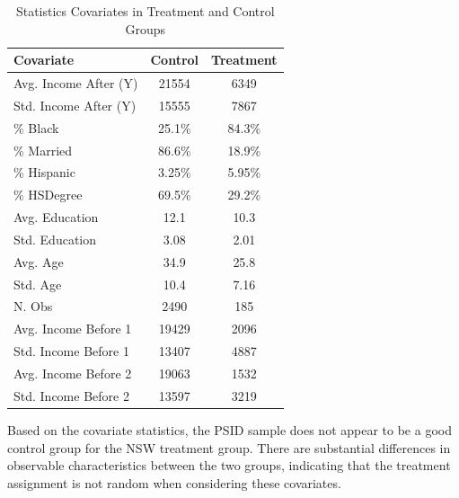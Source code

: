 \documentclass{article}
\begin{document}
\begin{table}[H]
    \centering
    \begin{tabular}{|l|c|c|}
    \hline
    \textbf{Covariate} & \textbf{Control} & \textbf{Treatment} \\
    \hline
    Avg. Income After (Y)  & 21554     & 6349 \\
    Std. Income After (Y)  & 15555     & 7867 \\
    \% Black               & 25.1\%     & 84.3\% \\
    \% Married             & 86.6\%     & 18.9\% \\
    \% Hispanic            & 3.25\%    & 5.95\% \\
    \% HSDegree            & 69.5\%    & 29.2\% \\
    Avg. Education         & 12.1      & 10.3 \\
    Std. Education         & 3.08      & 2.01 \\
    Avg. Age               & 34.9      & 25.8 \\
    Std. Age               & 10.4      & 7.16 \\
    N. Obs                 & 2490      & 185 \\
    Avg. Income Before 1   & 19429     & 2096 \\
    Std. Income Before 1   & 13407     & 4887 \\
    Avg. Income Before 2   & 19063     & 1532 \\
    Std. Income Before 2   & 13597     & 3219 \\
    \hline
    \end{tabular}
    \caption{Statistics Covariates in Treatment and Control Groups}
    \label{tab:earnings_distribution}
\end{table}

Based on the covariate statistics, the PSID sample does not appear to be a good control group for the NSW treatment group. There are substantial differences in observable characteristics between the two groups, indicating that the treatment assignment is not random when considering these covariates.
\end{document}
